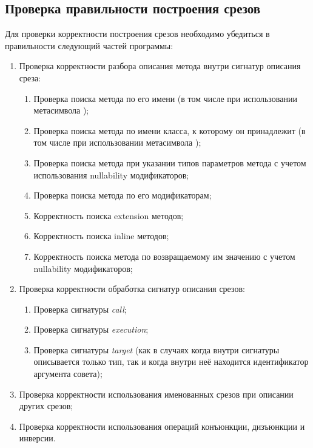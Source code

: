 \subsection{Проверка правильности построения срезов}
\label{subs:pointcut_testing_program}
Для проверки корректности построения срезов необходимо убедиться в правильности следующий частей программы:
\begin{enumerate}
    \item \label{list:method_items_check}Проверка корректности разбора описания метода внутри сигнатур описания среза:
    \begin{enumerate}
        \item \label{list:method_name_check}Проверка поиска метода по его имени (в том числе при использовании метасимвола \quotes{*});
        \item \label{list:class_name_check}Проверка поиска метода по имени класса, к которому он принадлежит (в том числе при использовании метасимвола \quotes{*});
        \item \label{list:method_params_check}Проверка поиска метода при указании типов параметров метода с учетом использования nullability модификаторов;
        \item \label{list:method_modifiers_check}Проверка поиска метода по его модификаторам;
        \item \label{list:method_extension_check}Корректность поиска extension методов;
        \item \label{list:method_inline_check}Корректность поиска inline методов;
        \item \label{list:method_return_value_check}Корректность поиска метода по возвращаемому им значению с учетом nullability модификаторов;
    \end{enumerate}
    \item \label{list:pointcut_items_check}Проверка корректности обработка сигнатур описания срезов:
    \begin{enumerate}
        \item \label{list:call_check}Проверка сигнатуры \textit{call};
        \item \label{list:execution_check}Проверка сигнатуры \textit{execution};
        \item \label{list:target_check}Проверка сигнатуры \textit{target} (как в случаях когда внутри сигнатуры описывается только тип, так и когда внутри неё находится идентификатор аргумента совета);
    \end{enumerate}
    \item \label{list:reference_pointcut_check}Проверка корректности использования именованных срезов при описании других срезов;
    \item \label{list:logic_operations_check}Проверка корректности использования операций конъюнкции, дизъюнкции и инверсии.
\end{enumerate}

